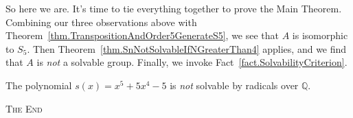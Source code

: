 So here we are. It's time to tie everything together to prove the Main Theorem. Combining  our three observations above with Theorem~\ref{thm.TranspositionAndOrder5GenerateS5}, we see that $A$ is isomorphic to $S_5$. Then Theorem~\ref{thm.SnNotSolvableIfNGreaterThan4} applies, and we find that $A$ is \emph{not} a solvable group. Finally, we invoke Fact~\ref{fact.SolvabilityCriterion}. 

\begin{theorem}
The polynomial $s(x) = x^5 +5x^4-5$ is \emph{not} solvable by radicals over $\mathbb{Q}$.
\end{theorem}

\begin{center}
\textsc{The End}
\end{center}









